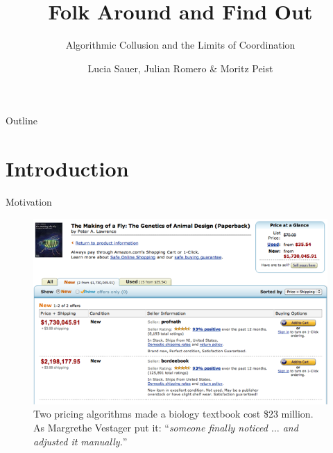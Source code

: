 \documentclass[10pt, aspectratio=169]{beamer}
\title{Folk Around and Find Out}
\subtitle{Algorithmic Collusion and the Limits of Coordination}
\date{}
\author{Lucia Sauer, Julian Romero \& Moritz Peist }
\institute{Barcelona School of Economics}
\begin{document}
\maketitle

\begin{frame}{Outline}
    \tableofcontents
\end{frame}


\section{Introduction}

\begin{frame}{Motivation}
\begin{figure}
        \centering
        \includegraphics[width=0.65\linewidth]{latex/slides_pricing_collusion/imgs/the_making_of_a_fly.png}
        \caption{Two pricing algorithms made a biology textbook cost \$23 million. As Margrethe Vestager \parencite*{vestager_algorithms_2017} put it: \enquote{\emph{someone finally noticed $\ldots$ and adjusted it manually.}}}
        \label{fig:rep_org}
    \end{figure}  
\end{frame}
\end{document}
